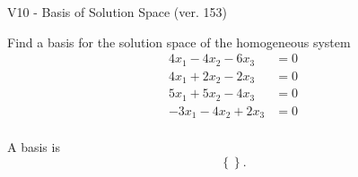 \begin{exercise}
  \begin{exerciseTitle}V10 - Basis of Solution Space (ver. 153)\end{exerciseTitle}
  \begin{exerciseStatement}
    Find a basis for the solution space of the homogeneous system 
\begin{align*}
 4 x_ 1 -4 x_ 2 -6 x_ 3 &= 0  \\ 
  4 x_ 1 + 2 x_ 2 -2 x_ 3 &= 0  \\ 
  5 x_ 1 + 5 x_ 2 -4 x_ 3 &= 0  \\ 
  -3 x_ 1 -4 x_ 2 + 2 x_ 3 &= 0  \\ 
 \end{align*}


 
  \end{exerciseStatement}

  \begin{exerciseAnswer}
   A basis is   
\[\left\{\right\}.\]

  


  \end{exerciseAnswer}
\end{exercise}